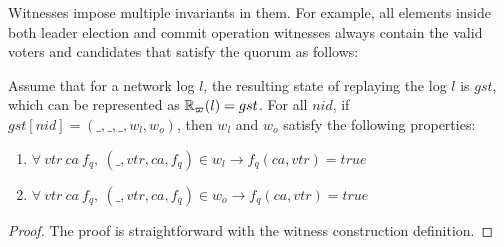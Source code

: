 


Witnesses impose multiple invariants in them.
For example, all elements inside both leader election and commit operation witnesses 
always contain the valid voters and candidates that satisfy the quorum as follows:
\vspace{-0.2em}

\begin{theorem}\label{thm:witness-invariant}
Assume that for a network log $l$, the resulting state of replaying the log $l$ 
	is $gst$, which can be represented as $\mathbb{R}_\varpi(l) = gst$. 
For all $nid$, if $gst[nid] = (\_, \_, \_, w_l, w_o)$, then $w_l$ and $w_o$ satisfy the following properties:
\begin{enumerate}
\item $\forall\ vtr\ ca\ f_q, \ (\_, vtr, ca, f_q) \in w_l \rightarrow f_q(ca, vtr) = true$
\item $\forall\ vtr\ ca\ f_q, \ (\_, vtr, ca, f_q) \in w_o \rightarrow f_q(ca, vtr) = true$
\end{enumerate}
\end{theorem}
\vspace{-0.2em}

\begin{proof}
The proof is straightforward with the witness construction definition.
\end{proof}
\vspace{-0.2em}

